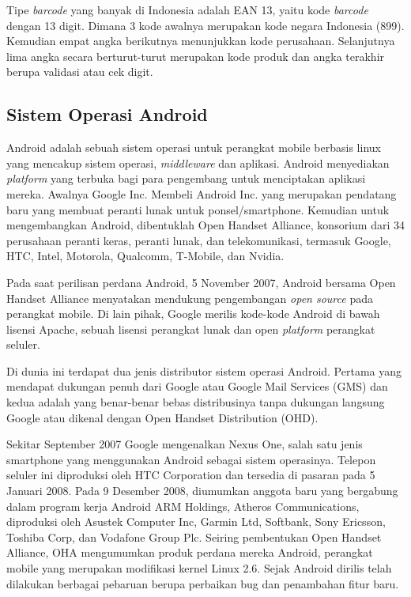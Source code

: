 \documentclass{jtetiproposalskripsi}
\begin{document}
Tipe \emph{barcode} yang banyak di Indonesia adalah EAN 13, yaitu kode \emph{barcode} dengan 13 digit. Dimana 3 kode awalnya merupakan kode negara Indonesia (899). Kemudian empat angka berikutnya menunjukkan kode perusahaan. Selanjutnya lima angka secara berturut-turut merupakan kode produk dan angka terakhir berupa validasi atau cek digit.

\subsection{Sistem Operasi Android}
Android adalah sebuah sistem operasi untuk perangkat mobile berbasis linux yang mencakup sistem operasi, \emph{middleware} dan aplikasi. Android menyediakan \emph{platform} yang terbuka bagi para pengembang untuk menciptakan  aplikasi mereka. Awalnya Google Inc. Membeli Android Inc. yang merupakan pendatang baru yang membuat peranti lunak untuk ponsel/smartphone. Kemudian untuk mengembangkan Android, dibentuklah Open Handset Alliance, konsorium dari 34 perusahaan peranti keras, peranti lunak, dan telekomunikasi, termasuk Google, HTC, Intel, Motorola, Qualcomm, T-Mobile, dan Nvidia.

Pada saat perilisan perdana Android, 5 November 2007, Android bersama Open Handset Alliance menyatakan mendukung pengembangan \emph{open source} pada perangkat mobile. Di lain pihak, Google merilis kode-kode Android di bawah lisensi Apache, sebuah lisensi perangkat lunak dan open \emph{platform} perangkat seluler.

Di dunia ini terdapat dua jenis distributor sistem operasi Android. Pertama yang mendapat dukungan penuh dari Google atau Google Mail Services (GMS) dan kedua adalah yang benar-benar bebas distribusinya tanpa dukungan langsung Google atau dikenal dengan Open Handset Distribution (OHD).

Sekitar September 2007 Google mengenalkan Nexus One, salah satu jenis smartphone yang menggunakan Android sebagai sistem operasinya. Telepon seluler ini diproduksi oleh HTC Corporation dan tersedia di pasaran pada 5 Januari 2008. Pada 9 Desember 2008, diumumkan anggota baru yang bergabung dalam program kerja Android ARM Holdings, Atheros Communications, diproduksi oleh Asustek Computer Inc, Garmin Ltd, Softbank, Sony Ericsson, Toshiba Corp, dan Vodafone Group Plc. Seiring pembentukan Open Handset Alliance, OHA mengumumkan produk perdana mereka Android, perangkat mobile yang merupakan modifikasi kernel Linux 2.6. Sejak Android dirilis telah dilakukan berbagai pebaruan berupa perbaikan bug dan penambahan fitur baru.
\end{document}
